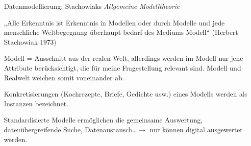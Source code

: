 \begin{frame}[allowframebreaks]{Datenmodellierung: Stachowiaks \emph{Allgemeine Modelltheorie}}
\small 

„Alle Erkenntnis ist Erkenntnis in Modellen oder durch Modelle und jede
menschliche Weltbegegnung überhaupt bedarf des Mediums Modell“ (Herbert Stachowiak 1973)
\smallskip


Modell =  Ausschnitt aus der realen Welt, allerdings
werden im Modell nur jene Attribute berücksichtigt, die für
meine Fragestellung relevant sind.
 Modell und Realwelt weichen somit voneinander ab.
\smallskip

Konkretisierungen (Kochrezepte, Briefe, Gedichte usw.) eines
Modells werden als Instanzen bezeichnet.
\smallskip

Standardisierte Modelle ermöglichen die gemeinsame
Auswertung, datenübergreifende Suche, Datenaustausch\dots $\to$ nur  können digital ausgewertet werden.
\smallskip

\end{frame}


